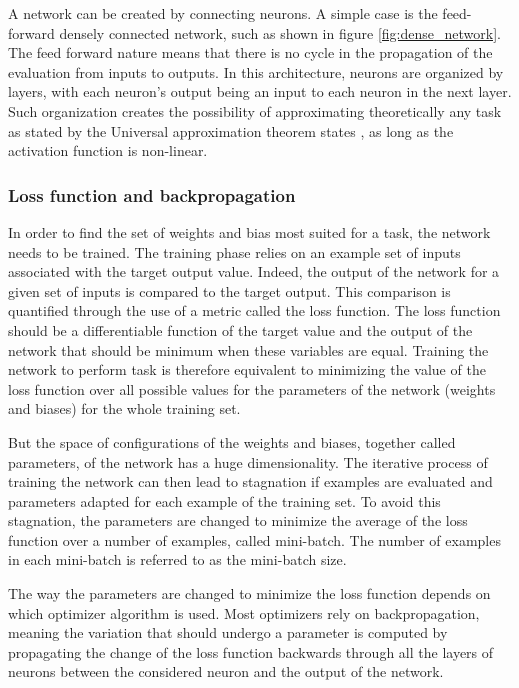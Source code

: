 A network can be created by connecting neurons. A simple case is the feed-forward densely connected network, such as shown in figure \ref{fig:dense_network}. The feed forward nature means that there is no cycle in the propagation of the evaluation from inputs to outputs. In this architecture, neurons are organized by layers, with each neuron's output being an input to each neuron in the next layer. Such organization creates the possibility of approximating theoretically any task as stated by the Universal approximation theorem states \cite{Cybenko1989}, as long as the activation function is non-linear.

\subsubsection{Loss function and backpropagation}

In order to find the set of weights and bias most suited for a task, the network needs to be trained.
The training phase relies on an example set of inputs associated with the target output value. Indeed, the output of the network for a given set of inputs is compared to the target output. This comparison is quantified through the use of a metric called the loss function. The loss function should be a differentiable function of the target value and the output of the network that should be minimum when these variables are equal. Training the network to perform task is therefore equivalent to minimizing the value of the loss function over all possible values for the parameters of the network (weights and biases) for the whole training set.

But the space of configurations of the weights and biases, together called parameters, of the network has a huge dimensionality. The iterative process of training the network can then lead to stagnation if examples are evaluated and parameters adapted for each example of the training set. To avoid this stagnation, the parameters are changed to minimize the average of the loss function over a number of examples, called mini-batch. The number of examples in each mini-batch is referred to as the mini-batch size.

The way the parameters are changed to minimize the loss function depends on which optimizer algorithm is used. Most optimizers rely on backpropagation, meaning the variation that should undergo a parameter is computed by propagating the change of the loss function backwards through all the layers of neurons between the considered neuron and the output of the network. 


